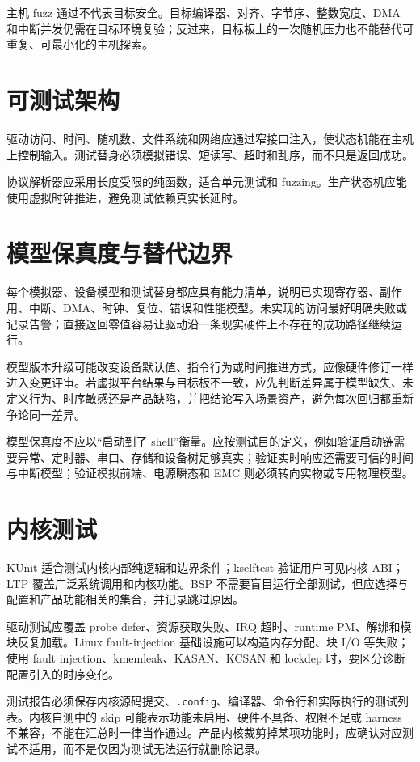 主机 fuzz 通过不代表目标安全。目标编译器、对齐、字节序、整数宽度、DMA 和中断并发仍需在目标环境复验；反过来，目标板上的一次随机压力也不能替代可重复、可最小化的主机探索。

\section{可测试架构}

驱动访问、时间、随机数、文件系统和网络应通过窄接口注入，使状态机能在主机上控制输入。测试替身必须模拟错误、短读写、超时和乱序，而不只是返回成功。

协议解析器应采用长度受限的纯函数，适合单元测试和 fuzzing。生产状态机应能使用虚拟时钟推进，避免测试依赖真实长延时。

\section{模型保真度与替代边界}

每个模拟器、设备模型和测试替身都应具有能力清单，说明已实现寄存器、副作用、中断、DMA、时钟、复位、错误和性能模型。未实现的访问最好明确失败或记录告警；直接返回零值容易让驱动沿一条现实硬件上不存在的成功路径继续运行。

模型版本升级可能改变设备默认值、指令行为或时间推进方式，应像硬件修订一样进入变更评审。若虚拟平台结果与目标板不一致，应先判断差异属于模型缺失、未定义行为、时序敏感还是产品缺陷，并把结论写入场景资产，避免每次回归都重新争论同一差异。

模型保真度不应以“启动到了 shell”衡量。应按测试目的定义，例如验证启动链需要异常、定时器、串口、存储和设备树足够真实；验证实时响应还需要可信的时间与中断模型；验证模拟前端、电源瞬态和 EMC 则必须转向实物或专用物理模型。

\section{内核测试}

KUnit 适合测试内核内部纯逻辑和边界条件\cite{linux-kunit-doc}；kselftest 验证用户可见内核 ABI\cite{linux-kselftest-doc}；LTP 覆盖广泛系统调用和内核功能。BSP 不需要盲目运行全部测试，但应选择与配置和产品功能相关的集合，并记录跳过原因。

驱动测试应覆盖 probe defer、资源获取失败、IRQ 超时、runtime PM、解绑和模块反复加载。Linux fault-injection 基础设施可以构造内存分配、块 I/O 等失败\cite{linux-fault-injection-doc}；使用 fault injection、kmemleak、KASAN、KCSAN 和 lockdep 时，要区分诊断配置引入的时序变化。

测试报告必须保存内核源码提交、\texttt{.config}、编译器、命令行和实际执行的测试列表。内核自测中的 skip 可能表示功能未启用、硬件不具备、权限不足或 harness 不兼容，不能在汇总时一律当作通过。产品内核裁剪掉某项功能时，应确认对应测试不适用，而不是仅因为测试无法运行就删除记录。

